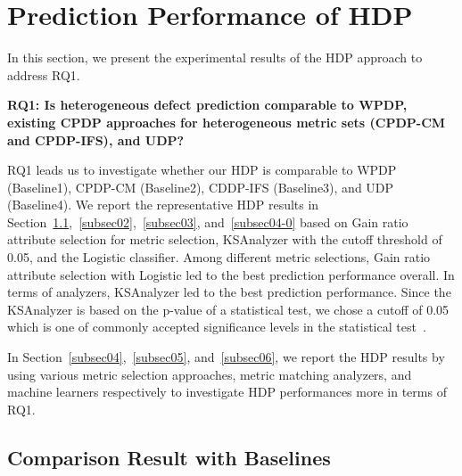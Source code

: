 \section{Prediction Performance of HDP}
\label{sec:Result}
In this section, we present the experimental results of the HDP approach to address RQ1.

{\bf RQ1: Is heterogeneous defect prediction comparable to WPDP, existing CPDP approaches for heterogeneous metric sets (CPDP-CM and CPDP-IFS), and UDP?}

RQ1 leads us to investigate whether our
HDP is comparable to WPDP (Baseline1), CPDP-CM
(Baseline2), CDDP-IFS (Baseline3), and UDP (Baseline4). We report the representative HDP results in Section~\ref{subsec01},~\ref{subsec02},~\ref{subsec03}, and~\ref{subsec04-0} based on Gain ratio attribute selection for metric selection, KSAnalyzer with the cutoff threshold of 0.05, and the Logistic classifier.
Among different metric selections, Gain ratio attribute selection with Logistic led to the best prediction performance overall. In terms of analyzers, KSAnalyzer led to the best prediction performance.
Since the KSAnalyzer is based on the p-value of a statistical test, we chose a cutoff of 0.05 which is one of commonly accepted significance levels in the statistical test~\cite{Corder09}.

In Section~\ref{subsec04},~\ref{subsec05}, and~\ref{subsec06}, we report the HDP results by using various metric selection approaches, metric matching analyzers, and machine learners respectively to investigate HDP performances more in terms of RQ1.

\subsection{Comparison Result with Baselines}
\label{subsec01}%

